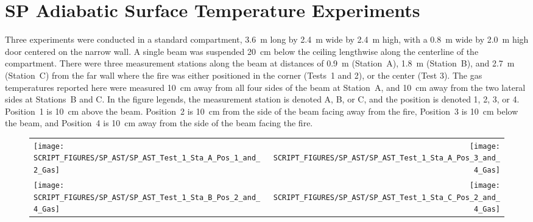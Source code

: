 
\clearpage

\section{SP Adiabatic Surface Temperature Experiments}

Three experiments were conducted in a standard compartment, 3.6~m long by 2.4~m wide by 2.4~m high, with a 0.8~m wide by 2.0~m high door centered on the narrow wall. A single beam was suspended 20~cm below the ceiling lengthwise along the centerline of the compartment. There were three measurement stations along the beam at distances of 0.9~m (Station~A), 1.8~m (Station~B), and 2.7~m (Station~C) from the far wall where the fire was either positioned in the corner (Tests~1 and 2), or the center (Test 3). The gas temperatures reported here were measured 10~cm away from all four sides of the beam at Station~A, and 10~cm away from the two lateral sides at Stations~B and C. In the figure legends, the measurement station is denoted A, B, or C, and the position is denoted 1, 2, 3, or 4. Position~1 is 10~cm above the beam. Position~2 is 10~cm from the side of the beam facing away from the fire, Position~3 is 10~cm below the beam, and Position~4 is 10~cm away from the side of the beam facing the fire.

\begin{figure}[h!]
\begin{tabular*}{\textwidth}{l@{\extracolsep{\fill}}r}
\texttt{[image: SCRIPT\_FIGURES/SP\_AST/SP\_AST\_Test\_1\_Sta\_A\_Pos\_1\_and\_2\_Gas]} &
\texttt{[image: SCRIPT\_FIGURES/SP\_AST/SP\_AST\_Test\_1\_Sta\_A\_Pos\_3\_and\_4\_Gas]} \\
\texttt{[image: SCRIPT\_FIGURES/SP\_AST/SP\_AST\_Test\_1\_Sta\_B\_Pos\_2\_and\_4\_Gas]} &
\texttt{[image: SCRIPT\_FIGURES/SP\_AST/SP\_AST\_Test\_1\_Sta\_C\_Pos\_2\_and\_4\_Gas]}
\end{tabular*}
\label{SP_Test_1_Gas}
\end{figure}

